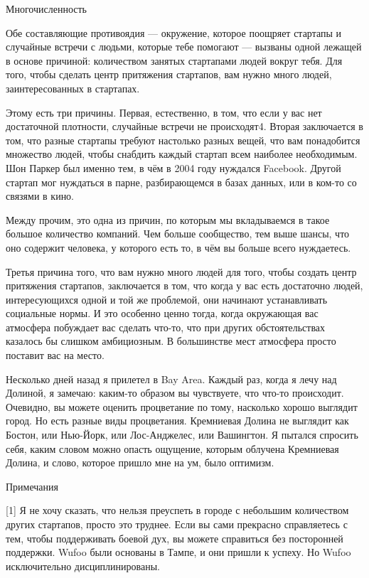 \documentclass[ebook,12pt,oneside,openany]{memoir}
\begin{document}
Многочисленность

Обе составляющие противоядия — окружение, которое поощряет стартапы и
случайные встречи с людьми, которые тебе помогают — вызваны одной
лежащей в основе причиной: количеством занятых стартапами людей вокруг
тебя. Для того, чтобы сделать центр притяжения стартапов, вам нужно
много людей, заинтересованных в стартапах.

Этому есть три причины. Первая, естественно, в том, что если у вас нет
достаточной плотности, случайные встречи не происходят4. Вторая
заключается в том, что разные стартапы требуют настолько разных вещей,
что вам понадобится множество людей, чтобы снабдить каждый стартап
всем наиболее необходимым. Шон Паркер был именно тем, в чём в 2004
году нуждался Facebook. Другой стартап мог нуждаться в парне,
разбирающемся в базах данных, или в ком-то со связями в кино.

Между прочим, это одна из причин, по которым мы вкладываемся в такое
большое количество компаний. Чем больше сообщество, тем выше шансы,
что оно содержит человека, у которого есть то, в чём вы больше всего
нуждаетесь.

Третья причина того, что вам нужно много людей для того, чтобы создать
центр притяжения стартапов, заключается в том, что когда у вас есть
достаточно людей, интересующихся одной и той же проблемой, они
начинают устанавливать социальные нормы. И это особенно ценно тогда,
когда окружающая вас атмосфера побуждает вас сделать что-то, что при
других обстоятельствах казалось бы слишком амбициозным. В большинстве
мест атмосфера просто поставит вас на место.

Несколько дней назад я прилетел в Bay Area. Каждый раз, когда я лечу
над Долиной, я замечаю: каким-то образом вы чувствуете, что что-то
происходит. Очевидно, вы можете оценить процветание по тому, насколько
хорошо выглядит город. Но есть разные виды процветания. Кремниевая
Долина не выглядит как Бостон, или Нью-Йорк, или Лос-Анджелес, или
Вашингтон. Я пытался спросить себя, каким словом можно опасть
ощущение, которым облучена Кремниевая Долина, и слово, которое пришло
мне на ум, было оптимизм.

Примечания

[1] Я не хочу сказать, что нельзя преуспеть в городе с небольшим
количеством других стартапов, просто это труднее. Если вы сами
прекрасно справляетесь с тем, чтобы поддерживать боевой дух, вы можете
справиться без посторонней поддержки. Wufoo были основаны в Тампе, и
они пришли к успеху. Но Wufoo исключительно дисциплинированы.
\end{document}

